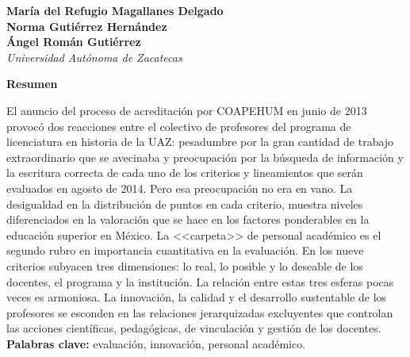 %


\thispagestyle{empty}
\normalfont\normalsize
{\par}
\setcounter{footnote}{0}


\bigskip
\begin{center}
{\bfseries María del Refugio Magallanes Delgado\\
Norma Gutiérrez Hernández\\
Ángel Román Gutiérrez}\\
{\itshape Universidad Autónoma de Zacatecas}
\end{center}

\bigskip
\textbf{Resumen}

El anuncio del proceso de acreditación por COAPEHUM en junio de 2013 provocó
dos reacciones entre el colectivo de profesores del programa de
licenciatura en historia de la UAZ: pesadumbre por la gran cantidad de
trabajo extraordinario que se avecinaba y preocupación por la búsqueda de
información y la escritura correcta de cada uno de los criterios y
lineamientos que serán evaluados en agosto de 2014. Pero esa preocupación
no era en vano. La desigualdad en la distribución de puntos en cada
criterio, muestra niveles diferenciados en la valoración que se hace en los
factores ponderables en la educación superior en México. La <<carpeta>> de
personal académico es el segundo rubro en importancia cuantitativa en la
evaluación. En los nueve criterios subyacen tres dimensiones: lo real, lo
posible y lo deseable de los docentes, el programa y la institución. La
relación entre estas tres esferas pocas veces es armoniosa. La innovación,
la calidad y el desarrollo sustentable de los profesores se esconden en las
relaciones jerarquizadas excluyentes que controlan las acciones
científicas, pedagógicas, de vinculación y gestión de los docentes.\\ 
{\bfseries Palabras clave:} evaluación, innovación, personal académico.


